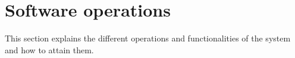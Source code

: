 \chapter{Software operations}
\label{chap:soptware_operations}

This section explains the different operations and functionalities of the system
and how to attain them.






